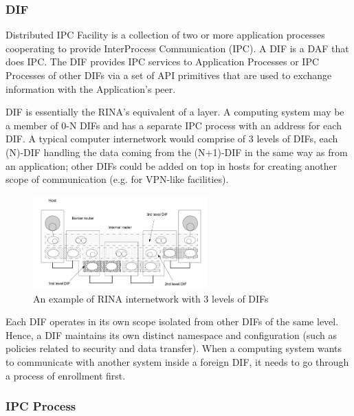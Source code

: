             \subsubsection{DIF}

                Distributed IPC Facility is a collection of two or more application processes cooperating to provide InterProcess Communication (IPC). A DIF is a DAF that does IPC. The DIF provides IPC services to Application Processes or IPC Processes of other DIFs via a set of API primitives that are used to exchange information with the Application's peer.

                DIF is essentially the RINA's equivalent of a layer. A computing system may be a member of 0-N DIFs and has a separate IPC process with an address for each DIF. A typical computer internetwork would comprise of 3 levels of DIFs, each (N)-DIF handling the data coming from the (N+1)-DIF in the same way as from an application; other DIFs could be added on top in hosts for creating another scope of communication (e.g. for VPN-like facilities).

                \begin{figure}[H]
                    \begin{center}
                        \includegraphics[width=0.6\textwidth]{fig/archs_rina-net.png}
                      \caption{An example of RINA internetwork with 3 levels of DIFs}
                      \label{fig:rina_network}
                    \end{center}
                \end{figure}

                Each DIF operates in its own scope isolated from other DIFs of the same level. Hence, a DIF maintains its own distinct namespace and configuration (such as policies related to security and data transfer). When a computing system wants to communicate with another system inside a foreign DIF, it needs to go through a process of enrollment first.

            \subsubsection{IPC Process}

